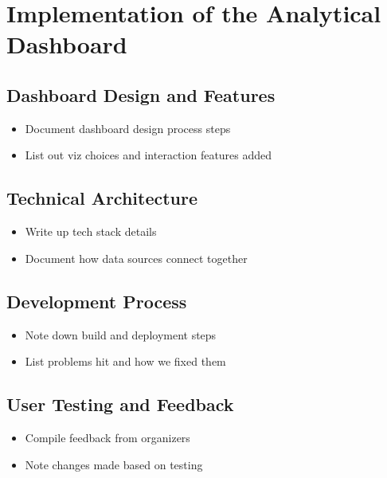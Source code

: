 \chapter{Implementation of the Analytical Dashboard}
\label{ch:implementation-of-the-analytical-dashboard}


\section{Dashboard Design and Features}
\label{sec:implementation-dashboard-design}
\begin{itemize}
    \item Document dashboard design process steps
    \item List out viz choices and interaction features added
\end{itemize}


\section{Technical Architecture}
\label{sec:implementation-technical-architecture}
\begin{itemize}
    \item Write up tech stack details
    \item Document how data sources connect together
\end{itemize}


\section{Development Process}
\label{sec:implementation-development-process}
\begin{itemize}
    \item Note down build and deployment steps
    \item List problems hit and how we fixed them
\end{itemize}


\section{User Testing and Feedback}
\label{sec:implementation-user-testing}
\begin{itemize}
    \item Compile feedback from organizers
    \item Note changes made based on testing
\end{itemize}


